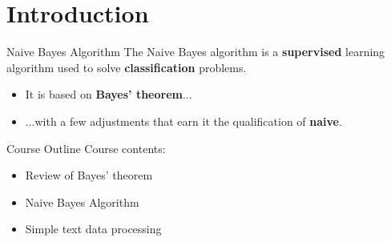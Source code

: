 \section[Introduction]{Introduction}

\begin{frame}{Naive Bayes Algorithm}
	The Naive Bayes algorithm is a \textbf{supervised} learning algorithm used to solve \textbf{classification} problems. \\
	\pause
	\vspace{0.5cm}
	\begin{itemize}
		\item It is based on \textbf{Bayes' theorem}...
		\pause
		\item ...with a few adjustments that earn it the qualification of \textbf{naive}.
	\end{itemize}
\end{frame}

\begin{frame}{Course Outline}
	Course contents:
	\begin{itemize}
		\item Review of Bayes' theorem
		\item Naive Bayes Algorithm
		\item Simple text data processing
	\end{itemize}
\end{frame}